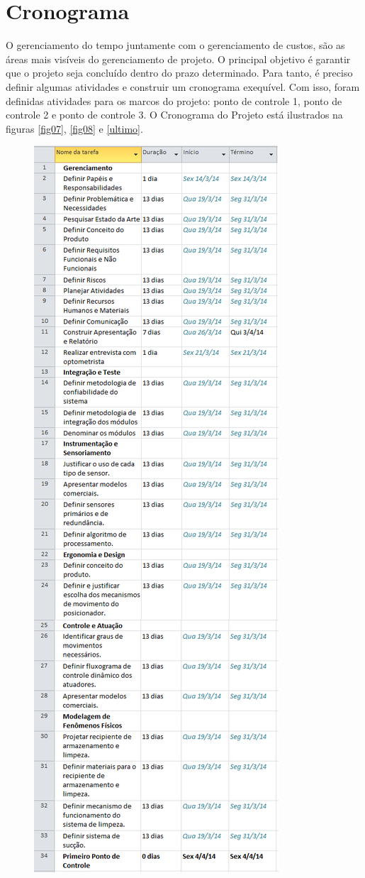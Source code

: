 \section[Cronograma]{Cronograma}

O gerenciamento do tempo juntamente com o gerenciamento de custos, são as áreas mais visíveis do gerenciamento de projeto. O principal objetivo é garantir que o projeto seja concluído dentro do prazo determinado. Para tanto, é preciso definir algumas atividades e construir um cronograma exequível. Com isso, foram definidas atividades para os marcos do projeto: ponto de controle 1, ponto de controle 2 e ponto de controle 3. O Cronograma do Projeto está ilustrados na figuras \ref{fig07}, \ref{fig08} e \ref{ultimo}.

\begin{figure}[H]
		\centering
			\includegraphics[scale=0.65]{figuras/cronograma1.png}

\end{figure}
